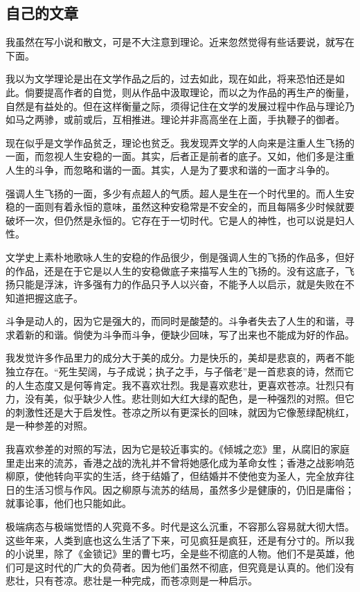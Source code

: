 \subsection{自己的文章}

\par 我虽然在写小说和散文，可是不大注意到理论。近来忽然觉得有些话要说，就写在下面。
\par 我以为文学理论是出在文学作品之后的，过去如此，现在如此，将来恐怕还是如此。倘要提高作者的自觉，则从作品中汲取理论，而以之为作品的再生产的衡量，自然是有益处的。但在这样衡量之际，须得记住在文学的发展过程中作品与理论乃如马之两骖，或前或后，互相推进。理论并非高高坐在上面，手执鞭子的御者。
\par 现在似乎是文学作品贫乏，理论也贫乏。我发现弄文学的人向来是注重人生飞扬的一面，而忽视人生安稳的一面。其实，后者正是前者的底子。又如，他们多是注重人生的斗争，而忽略和谐的一面。其实，人是为了要求和谐的一面才斗争的。
\par 强调人生飞扬的一面，多少有点超人的气质。超人是生在一个时代里的。而人生安稳的一面则有着永恒的意味，虽然这种安稳常是不安全的，而且每隔多少时候就要破坏一次，但仍然是永恒的。它存在于一切时代。它是人的神性，也可以说是妇人性。
\par 文学史上素朴地歌咏人生的安稳的作品很少，倒是强调人生的飞扬的作品多，但好的作品，还是在于它是以人生的安稳做底子来描写人生的飞扬的。没有这底子，飞扬只能是浮沫，许多强有力的作品只予人以兴奋，不能予人以启示，就是失败在不知道把握这底子。
\par 斗争是动人的，因为它是强大的，而同时是酸楚的。斗争者失去了人生的和谐，寻求着新的和谐。倘使为斗争而斗争，便缺少回味，写了出来也不能成为好的作品。
\par 我发觉许多作品里力的成分大于美的成分。力是快乐的，美却是悲哀的，两者不能独立存在。“死生契阔，与子成说；执子之手，与子偕老”是一首悲哀的诗，然而它的人生态度又是何等肯定。我不喜欢壮烈。我是喜欢悲壮，更喜欢苍凉。壮烈只有力，没有美，似乎缺少人性。悲壮则如大红大绿的配色，是一种强烈的对照。但它的刺激性还是大于启发性。苍凉之所以有更深长的回味，就因为它像葱绿配桃红，是一种参差的对照。
\par 我喜欢参差的对照的写法，因为它是较近事实的。《倾城之恋》里，从腐旧的家庭里走出来的流苏，香港之战的洗礼并不曾将她感化成为革命女性；香港之战影响范柳原，使他转向平实的生活，终于结婚了，但结婚并不使他变为圣人，完全放弃往日的生活习惯与作风。因之柳原与流苏的结局，虽然多少是健康的，仍旧是庸俗；就事论事，他们也只能如此。
\par 极端病态与极端觉悟的人究竟不多。时代是这么沉重，不容那么容易就大彻大悟。这些年来，人类到底也这么生活了下来，可见疯狂是疯狂，还是有分寸的。所以我的小说里，除了《金锁记》里的曹七巧，全是些不彻底的人物。他们不是英雄，他们可是这时代的广大的负荷者。因为他们虽然不彻底，但究竟是认真的。他们没有悲壮，只有苍凉。悲壮是一种完成，而苍凉则是一种启示。
